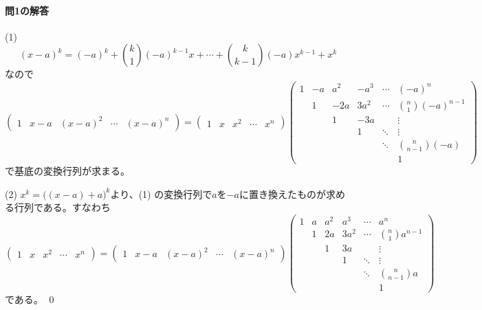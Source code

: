 \paragraph{問1の解答}
\noindent (1)
\[
(x - a) ^k = (-a)^k + \binom{k}{1} (-a)^{k - 1} x + \cdots + \binom{k}{k - 1} (-a) x^{k - 1} + x^k
\]
なので
\[
\begin{pmatrix}
1 & x - a & (x - a)^2 & \cdots & (x - a)^n
\end{pmatrix}
=
\begin{pmatrix}
1 & x & x^2 & \cdots & x^n
\end{pmatrix}
\begin{pmatrix}
1 & -a & a^2 & -a^3 & \cdots & (-a)^n \\
 & 1 & -2a & 3a^2 & \cdots & \binom{n}{1}(-a)^{n - 1} \\
 & & 1 & -3a & & \vdots \\
 & & & 1 & \ddots & \vdots \\
 & & & & \ddots & \binom{n}{n - 1}(-a) \\
 & & & & & 1
\end{pmatrix}
\]
で基底の変換行列が求まる。

\noindent (2) $x^k = \bigl((x - a) + a\bigr)^k$より、(1) の変換行列で$a$を$-a$に置き換えたものが求める行列である。すなわち
\[
\begin{pmatrix}
1 & x & x^2 & \cdots & x^n
\end{pmatrix}
=
\begin{pmatrix}
1 & x - a & (x - a)^2 & \cdots & (x - a)^n
\end{pmatrix}
\begin{pmatrix}
1 & a & a^2 & a^3 & \cdots & a^n \\
 & 1 & 2a & 3a^2 & \cdots & \binom{n}{1}a^{n - 1} \\
 & & 1 & 3a & & \vdots \\
 & & & 1 & \ddots & \vdots \\
 & & & & \ddots & \binom{n}{n - 1}a \\
 & & & & & 1
\end{pmatrix}
\]
である。 \qed


